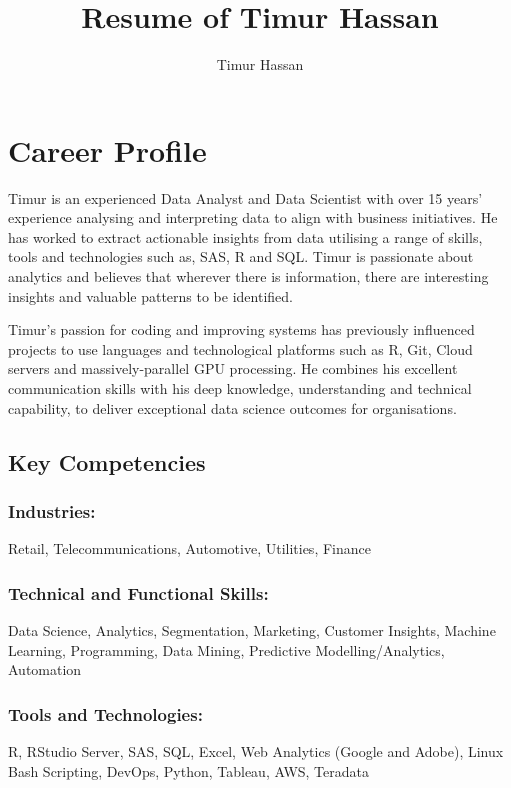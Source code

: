 \documentclass{article}
\begin{document}
\title{Resume of Timur Hassan}
\author{Timur Hassan}

\maketitle

\section{Career Profile}
Timur is an experienced Data Analyst and Data Scientist with over 15 years’ experience analysing and interpreting data to align with business initiatives. He has worked to extract actionable insights from
data utilising a range of skills, tools and technologies such as, SAS, R and SQL. Timur is passionate about analytics and believes that wherever there is information, there are interesting insights and
valuable patterns to be identified.

Timur's passion for coding and improving systems has previously influenced projects to use languages and technological platforms such as R, Git, Cloud servers and massively-parallel GPU
processing. He combines his excellent communication skills with his deep knowledge, understanding and technical capability, to deliver exceptional data science outcomes for organisations.

\subsection{Key Competencies}
\subsubsection{Industries:}
Retail, Telecommunications, Automotive, Utilities, Finance

\subsubsection{Technical and Functional Skills:}
Data Science, Analytics, Segmentation, Marketing, Customer Insights, Machine Learning, Programming, Data Mining, Predictive Modelling/Analytics, Automation

\subsubsection{Tools and Technologies:}
R, RStudio Server, SAS, SQL, Excel, Web Analytics (Google and Adobe), Linux Bash Scripting, DevOps, Python, Tableau, AWS, Teradata
\end{document}
